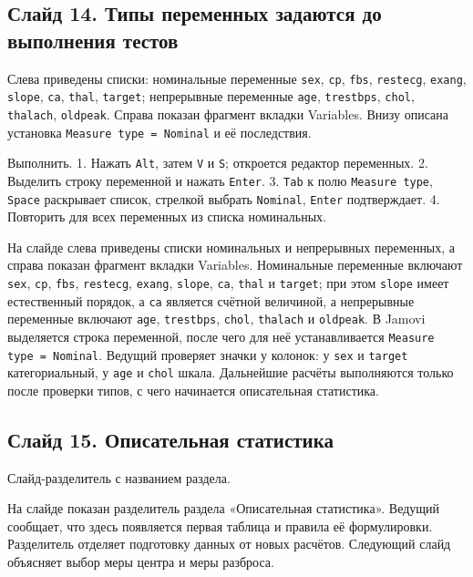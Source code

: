 \documentclass[11pt,a4paper]{article}
\begin{document}
\subsection*{Слайд 14. Типы переменных задаются до выполнения тестов}
\begin{onslide}
Слева приведены списки: номинальные переменные \texttt{sex}, \texttt{cp}, \texttt{fbs}, \texttt{restecg}, \texttt{exang}, \texttt{slope}, \texttt{ca}, \texttt{thal}, \texttt{target}; непрерывные переменные \texttt{age}, \texttt{trestbps}, \texttt{chol}, \texttt{thalach}, \texttt{oldpeak}. Справа показан фрагмент вкладки Variables. Внизу описана установка \texttt{Measure type = Nominal} и её последствия.
\end{onslide}
\begin{jamovi}
Выполнить. 1. Нажать \texttt{Alt}, затем \texttt{V} и \texttt{S}; откроется редактор переменных. 2. Выделить строку переменной и нажать \texttt{Enter}. 3. \texttt{Tab} к полю \texttt{Measure type}, \texttt{Space} раскрывает список, стрелкой выбрать \texttt{Nominal}, \texttt{Enter} подтверждает. 4. Повторить для всех переменных из списка номинальных.
\end{jamovi}
На слайде слева приведены списки номинальных и непрерывных переменных, а справа показан фрагмент вкладки Variables. Номинальные переменные включают \texttt{sex}, \texttt{cp}, \texttt{fbs}, \texttt{restecg}, \texttt{exang}, \texttt{slope}, \texttt{ca}, \texttt{thal} и \texttt{target}; при этом \texttt{slope} имеет естественный порядок, а \texttt{ca} является счётной величиной, а непрерывные переменные включают \texttt{age}, \texttt{trestbps}, \texttt{chol}, \texttt{thalach} и \texttt{oldpeak}. В Jamovi выделяется строка переменной, после чего для неё устанавливается \texttt{Measure type = Nominal}. Ведущий проверяет значки у колонок: у \texttt{sex} и \texttt{target} категориальный, у \texttt{age} и \texttt{chol} шкала. Дальнейшие расчёты выполняются только после проверки типов, с чего начинается описательная статистика.

\subsection*{Слайд 15. Описательная статистика}
\begin{onslide}
Слайд-разделитель с названием раздела.
\end{onslide}
На слайде показан разделитель раздела «Описательная статистика». Ведущий сообщает, что здесь появляется первая таблица и правила её формулировки. Разделитель отделяет подготовку данных от новых расчётов. Следующий слайд объясняет выбор меры центра и меры разброса.
\end{document}
